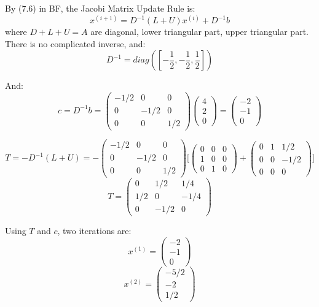 \documentclass[12pt]{article} %
\newcommand{\1}[1]{\mathds{1}\left[#1\right]}
\begin{document}
By (7.6) in BF, the Jacobi Matrix Update Rule is:
$$
	x^{(i+1)} = D^{-1}(L+U)x^{(i)} + D^{-1}b
$$ where $D+L+U=A$ are diagonal, lower triangular part, upper triangular part. There is no complicated inverse, and:
$$
	D^{-1} = 
	diag([-\frac12, -\frac12, \frac12])
$$

And:
$$
	c = D^{-1}b = 
	\begin{pmatrix}
		-1/2 & 0 & 0 \\
		0 & -1/2 & 0 \\
		0 & 0 & 1/2
	\end{pmatrix}
	\begin{pmatrix}
		4\\
		2\\
		0 
	\end{pmatrix} = 
	\begin{pmatrix}
		-2\\
		-1\\
		0 
	\end{pmatrix}
$$

$$
	T = 
	-D^{-1}(L+U) = 
	-\begin{pmatrix}
		-1/2 & 0 & 0 \\
		0 & -1/2 & 0 \\
		0 & 0 & 1/2
	\end{pmatrix}
	\Bigg[
	\begin{pmatrix}
		0 & 0 & 0 \\
		1 & 0 & 0 \\
		0 & 1 & 0
	\end{pmatrix}+
	\begin{pmatrix}
		0 & 1 & 1/2 \\
		0 & 0 & -1/2 \\
		0 & 0 & 0
	\end{pmatrix}
	\Bigg]
$$
$$
	T = \begin{pmatrix}
		0&1/2  & 1/4 \\
		1/2&0 & -1/4 \\
		0 & -1/2 &0
	\end{pmatrix}
$$

Using $T$ and $c$, two iterations are:
$$
	x^{(1)} = 
	\begin{pmatrix}
		-2\\
		-1\\
		0 
	\end{pmatrix}
$$
$$
	x^{(2)} = 
	\begin{pmatrix}
		-5/2\\
		-2\\
		1/2 
	\end{pmatrix}
$$
\end{document}
